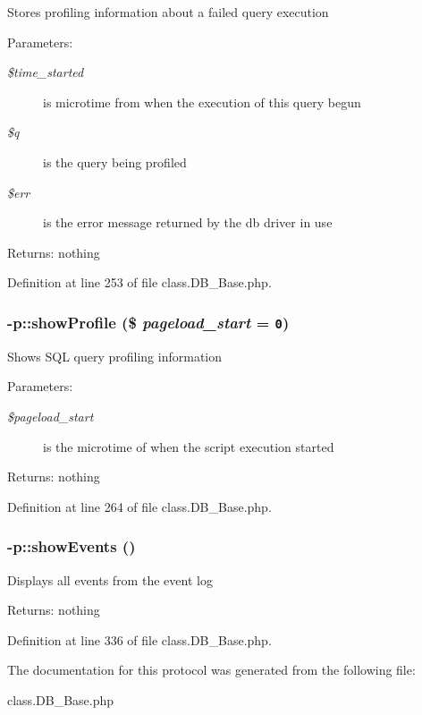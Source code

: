 Stores profiling information about a failed query execution \begin{Desc}
\item[Parameters:]
\begin{description}
\item[{\em \$time\_\-started}]is microtime from when the execution of this query begun \item[{\em \$q}]is the query being profiled \item[{\em \$err}]is the error message returned by the db driver in use \end{description}
\end{Desc}
\begin{Desc}
\item[Returns:]nothing \end{Desc}


Definition at line 253 of file class.DB\_\-Base.php.
\subsubsection{-p::showProfile (\$ {\em pageload\_\-start} = {\tt 0})}\label{protocolDB__Base-p_9f2a2a4e8709b73121f761ca378b74f2}


Shows SQL query profiling information \begin{Desc}
\item[Parameters:]
\begin{description}
\item[{\em \$pageload\_\-start}]is the microtime of when the script execution started \end{description}
\end{Desc}
\begin{Desc}
\item[Returns:]nothing \end{Desc}


Definition at line 264 of file class.DB\_\-Base.php.
\subsubsection{-p::showEvents ()}\label{protocolDB__Base-p_82c42d41becb749cc2b3f817983529b0}


Displays all events from the event log \begin{Desc}
\item[Returns:]nothing \end{Desc}


Definition at line 336 of file class.DB\_\-Base.php.

The documentation for this protocol was generated from the following file:\begin{CompactItemize}
\item 
class.DB\_\-Base.php\end{CompactItemize}
